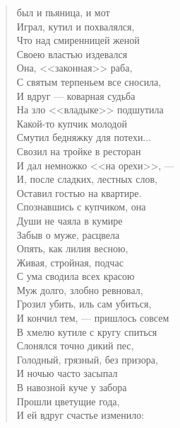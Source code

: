 \newpage
\vspace*{0cm}


\begin{verse}
\begin{patverse*}
 был и пьяница, и мот\ldotst\\
Играл, кутил и похвалялся,\\
Что над смиренницей женой\\
Своею властью издевался\ldotse\\
Она, <<законная>> раба,\\
С святым терпеньем все сносила,\\
И вдруг --- коварная судьба\\
На зло <<владыке>> подшутила\ldotse\\
Какой-то купчик молодой\\
Смутил бедняжку для потехи...\\
Свозил на тройке в ресторан\\
И дал немножко <<на орехи>>, ---\\
И, после сладких, лестных слов,\\
Оставил гостью на квартире.\\
Спознавшись с купчиком, она\\
Души не чаяла в кумире\ldotst\\
Забыв о муже, расцвела\\
Опять, как лилия весною,\\
Живая, стройная, подчас\\
С ума сводила всех красою\ldotst\\
Муж долго, злобно ревновал,\\
Грозил убить, иль сам убиться,\\
И кончил тем, --- пришлось совсем\\
В хмелю кутиле с кругу спиться\ldotst\\
Слонялся точно дикий пес,\\
Голодный, грязный, без призора,\\
И ночью часто засыпал\\
В навозной куче у забора\ldotst\\
Прошли цветущие года,\\
И ей вдруг счастье изменило:\\

\end{patverse*}
\end{verse}
